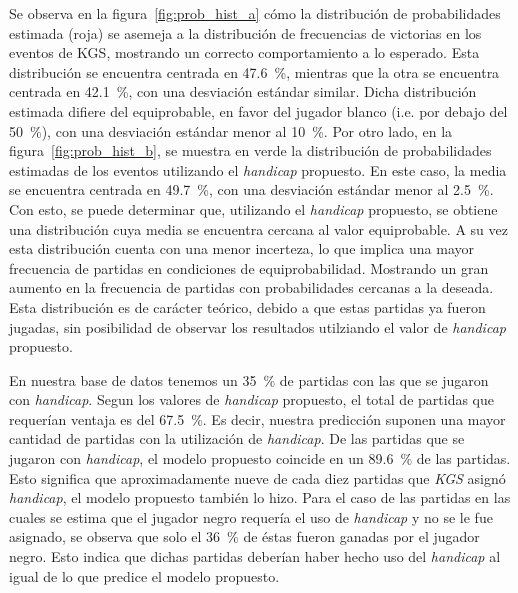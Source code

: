 \documentclass[11pt,twoside,spanish]{report} %
\begin{document}
Se observa en la figura~\ref{fig:prob_hist_a} c\'omo la distribuci\'on de probabilidades estimada (roja) se asemeja a la distribuci\'on de frecuencias de victorias en los eventos de KGS, mostrando un correcto comportamiento a lo esperado. 
Esta distribuci\'on se encuentra centrada en \SI{47.6}{\percent}, mientras que la otra se encuentra centrada en  \SI{42.1}{\percent}, con una desviaci\'on est\'andar similar.
Dicha distribuci\'on estimada difiere del equiprobable, en favor del jugador blanco (i.e. por debajo del \SI{50}{\percent}), con una desviaci\'on est\'andar menor al \SI{10}{\percent}.
Por otro lado, en la figura~\ref{fig:prob_hist_b},  se muestra en verde la distribuci\'on de probabilidades estimadas de los eventos utilizando el \textit{handicap} propuesto.
En este caso, la media se encuentra centrada en \SI{49.7}{\percent}, con una desviaci\'on est\'andar menor al \SI{2.5}{\percent}.
Con esto, se puede determinar que, utilizando el \textit{handicap} propuesto, se obtiene una distribuci\'on cuya media se encuentra cercana al valor equiprobable.
A su vez esta distribuci\'on cuenta con una menor incerteza, lo que implica una mayor frecuencia de partidas en condiciones de equiprobabilidad.
Mostrando un gran aumento en la frecuencia de partidas con probabilidades cercanas a la deseada.
Esta distribuci\'on es de car\'acter te\'orico, debido a que estas partidas ya fueron jugadas, sin posibilidad de observar los resultados utilziando el valor de \textit{handicap} propuesto.



En nuestra base de datos tenemos un \SI{35}{\percent} de partidas con las que se jugaron con \textit{handicap}.
Segun los valores de \textit{handicap} propuesto, el total de partidas que requer\'ian ventaja es del \SI{67.5}{\percent}.
Es decir, nuestra predicci\'on suponen una mayor cantidad de partidas con la utilizaci\'on de \textit{handicap}.
De las partidas que se jugaron con \textit{handicap}, el modelo propuesto coincide en un \SI{89.6}{\percent} de las partidas.
Esto significa que aproximadamente nueve de cada diez partidas que \textit{KGS} asign\'o \textit{handicap}, el modelo propuesto tambi\'en lo hizo.
Para el caso de las partidas en las cuales se estima que el jugador negro  requer\'ia el uso de \textit{handicap} y no se le fue asignado, se observa que solo el \SI{36}{\percent} de \'estas fueron ganadas por el jugador negro.
Esto indica que dichas partidas deber\'ian haber hecho uso del \textit{handicap} al igual de lo que predice el modelo propuesto.
\end{document}
